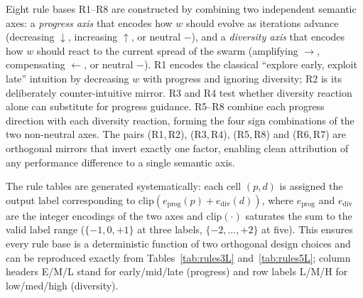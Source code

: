 \documentclass[runningheads]{llncs}
\begin{document}

Eight rule bases R1--R8 are constructed by combining two independent semantic axes: a \emph{progress axis} that encodes how $w$ should evolve as iterations advance (decreasing $\downarrow$, increasing $\uparrow$, or neutral $-$), and a \emph{diversity axis} that encodes how $w$ should react to the current spread of the swarm (amplifying $\rightarrow$, compensating $\leftarrow$, or neutral $-$). R1 encodes the classical ``explore early, exploit late'' intuition by decreasing $w$ with progress and ignoring diversity; R2 is its deliberately counter-intuitive mirror. R3 and R4 test whether diversity reaction alone can substitute for progress guidance. R5--R8 combine each progress direction with each diversity reaction, forming the four sign combinations of the two non-neutral axes. The pairs (R1,\,R2), (R3,\,R4), (R5,\,R8) and (R6,\,R7) are orthogonal mirrors that invert exactly one factor, enabling clean attribution of any performance difference to a single semantic axis.

The rule tables are generated systematically: each cell $(p, d)$ is assigned the output label corresponding to $\mathrm{clip}(e_{\text{prog}}(p) + e_{\text{div}}(d))$, where $e_{\text{prog}}$ and $e_{\text{div}}$ are the integer encodings of the two axes and $\mathrm{clip}(\cdot)$ saturates the sum to the valid label range ($\{-1,0,+1\}$ at three labels, $\{-2,\dots,+2\}$ at five). This ensures every rule base is a deterministic function of two orthogonal design choices and can be reproduced exactly from Tables~\ref{tab:rules3L} and~\ref{tab:rules5L}; column headers E/M/L stand for early/mid/late (progress) and row labels L/M/H for low/med/high (diversity).
\end{document}
